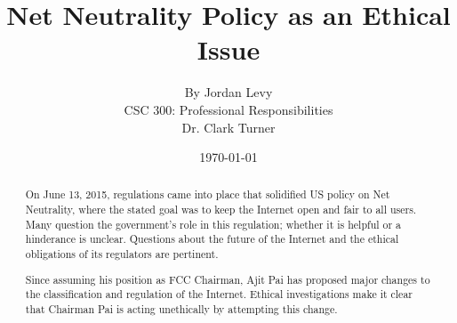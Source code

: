 \documentclass[12pt]{article}
\begin{document}
\title{\vfill Net Neutrality Policy as an Ethical Issue} %
\author{
By Jordan Levy \vspace{10pt} \\
CSC 300: Professional Responsibilities  \vspace{10pt} \\
Dr. Clark Turner \vspace{10pt} \\
}
\date{\today}

\maketitle

\vfill  %
\begin{abstract} %
On June 13, 2015, regulations came into place that solidified US policy on Net Neutrality, where the stated goal was to keep the Internet open and fair to all users.\cite{cnn-fcc} Many question the government's role in this regulation; whether it is helpful or a hinderance is unclear. Questions about the future of the Internet and the ethical obligations of its regulators are pertinent.

Since assuming his position as FCC Chairman, Ajit Pai has proposed major changes to the classification and regulation of the Internet.\cite{pbs-pai-makes-case} Ethical investigations make it clear that Chairman Pai is acting unethically by attempting this change.

\end{abstract}

\thispagestyle{empty} %
\newpage

\newpage

\tableofcontents


\end{document}
